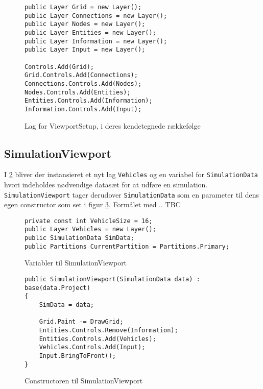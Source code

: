 \begin{figure}[H]
\begin{lstlisting}
public Layer Grid = new Layer();
public Layer Connections = new Layer();
public Layer Nodes = new Layer();
public Layer Entities = new Layer();
public Layer Information = new Layer();
public Layer Input = new Layer();

Controls.Add(Grid);
Grid.Controls.Add(Connections);
Connections.Controls.Add(Nodes);
Nodes.Controls.Add(Entities);
Entities.Controls.Add(Information);
Information.Controls.Add(Input);
\end{lstlisting}
\caption{Lag for ViewportSetup, i deres kendetegnede rækkefølge}
\label{ViewportSetupLayers}
\end{figure}

\subsection{SimulationViewport}\label{SimulationViewport}

I \ref{ViewPortSimulation} bliver der instansieret et nyt lag \texttt{Vehicles} og en variabel for \texttt{SimulationData} hvori indeholdes nødvendige datasæt for at udføre en simulation. \texttt{SimulationViewport} tager derudover \texttt{SimulationData} som en parameter til dens egen constructor som set i figur \ref{ViewportSimulationConstructor}. Formålet med .. TBC

\begin{figure}[H]
\begin{lstlisting}
private const int VehicleSize = 16;
public Layer Vehicles = new Layer();
public SimulationData SimData;
public Partitions CurrentPartition = Partitions.Primary;
\end{lstlisting}
\caption{Variabler til SimulationViewport}
\label{ViewPortSimulation}
\end{figure}

\begin{figure}[H]
\begin{lstlisting}
public SimulationViewport(SimulationData data) : base(data.Project)
{
    SimData = data;
            
    Grid.Paint -= DrawGrid;
    Entities.Controls.Remove(Information);
    Entities.Controls.Add(Vehicles);
    Vehicles.Controls.Add(Input);
    Input.BringToFront();
}
\end{lstlisting}
\caption{Constructoren til SimulationViewport}
\label{ViewportSimulationConstructor}
\end{figure}

